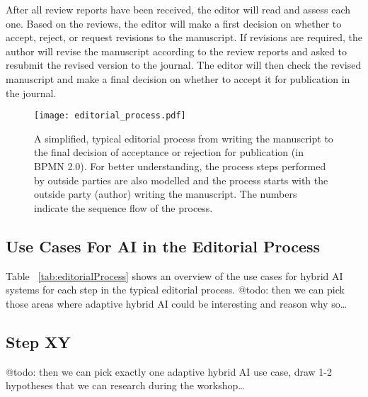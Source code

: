After all review reports have been received, the editor will read and assess each one. Based on the reviews, the editor will make a first
decision on whether to accept, reject, or request revisions to the manuscript. If revisions are required, the author will revise the manuscript
according to the review reports and asked to resubmit the revised version to the journal. The editor will then check the revised manuscript
and make a final decision on whether to accept it for publication in the journal.

\begin{landscape}
    \begin{figure*}[htb]
        \centering
        \texttt{[image: editorial\_process.pdf]}
        \caption{A simplified, typical editorial process from writing the manuscript to the final decision of acceptance or
        rejection for publication (in BPMN 2.0). For better understanding, the process steps performed by outside parties 
        are also modelled and the process starts with the outside party (author) writing the manuscript. The numbers
        indicate the sequence flow of the process.}
        \label{fig:bpmnEditorialProcess}
    \end{figure*}
\end{landscape}

\subsection{Use Cases For AI in the Editorial Process}

Table  ~\ref{tab:editorialProcess} shows an overview of the use cases for hybrid AI systems for each step in the typical editorial process.
{\color{purple} @todo: then we can pick those areas where adaptive hybrid AI could be interesting and reason why so\dots}


\subsection{Step XY}

{\color{purple} @todo: then we can pick exactly one adaptive hybrid AI use case, draw 1-2 hypotheses that we can research 
during the workshop\dots}


